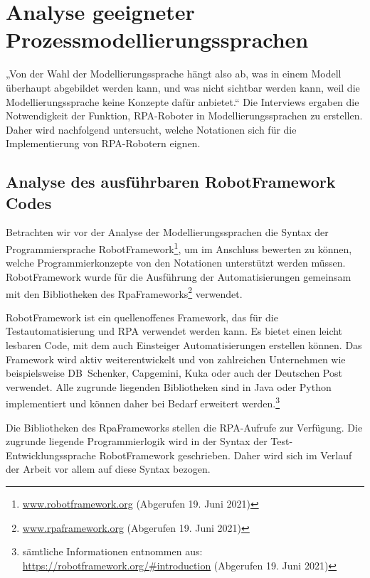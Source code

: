 \section{Analyse geeigneter Prozessmodellierungssprachen}\label{analyse_sprachen}

„Von der Wahl der Modellierungssprache hängt also ab, was in einem Modell überhaupt abgebildet werden kann, und was nicht sichtbar werden kann, weil die Modellierungssprache keine Konzepte dafür anbietet.“ \cite{Fleischmann2018} Die Interviews ergaben die Notwendigkeit der Funktion, RPA-Roboter in Modellierungssprachen zu erstellen. Daher wird nachfolgend untersucht, welche Notationen sich für die Implementierung von RPA-Robotern eignen. 

\subsection{Analyse des ausführbaren RobotFramework Codes}

Betrachten wir vor der Analyse der Modellierungssprachen die Syntax der Programmiersprache RobotFramework\footnote{\url{www.robotframework.org} (Abgerufen 19. Juni 2021)}, um im Anschluss bewerten zu können, welche Programmierkonzepte von den Notationen unterstützt werden müssen. RobotFramework wurde für die Ausführung der Automatisierungen gemeinsam mit den Bibliotheken des RpaFrameworks\footnote{\url{www.rpaframework.org} (Abgerufen 19. Juni 2021)} verwendet. 

RobotFramework ist ein quellenoffenes Framework, das für die Testautomatisierung und RPA verwendet werden kann. Es bietet einen leicht lesbaren Code, mit dem auch Einsteiger Automatisierungen erstellen können. Das Framework wird aktiv weiterentwickelt und von zahlreichen Unternehmen wie beispielsweise DB~Schenker,  Capgemini, Kuka oder auch der Deutschen Post verwendet. Alle zugrunde liegenden Bibliotheken sind in Java oder Python implementiert und können daher bei Bedarf erweitert werden.\footnote{sämtliche Informationen entnommen aus: \\ \url{https://robotframework.org/\#introduction} (Abgerufen 19. Juni 2021)}

Die Bibliotheken des \mbox{RpaFrameworks} stellen die RPA-Aufrufe zur Verfügung. Die zugrunde liegende Programmierlogik wird in der Syntax der Test-Entwicklungssprache \mbox{RobotFramework} geschrieben. Daher wird sich im Verlauf der Arbeit vor allem auf diese Syntax bezogen. 


